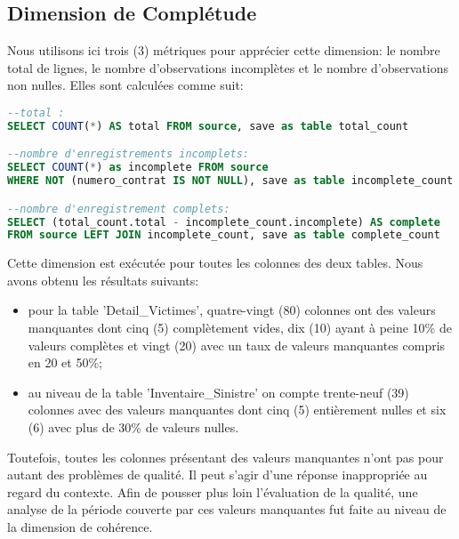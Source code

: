 \subsection{Dimension de Compl\'etude} 
Nous utilisons ici trois (3) m\'etriques pour appr\'ecier cette dimension: le nombre total de lignes, le nombre d'observations incompl\`etes et le nombre d'observations non nulles. Elles sont calcul\'ees comme suit: 
\begin{lstlisting}[language=SQL,caption={R\`egles de la Dimension Compl\'etude},captionpos=b ,showspaces=false,basicstyle=\scriptsize,numbers=none,commentstyle=\color{gray},backgroundcolor=\color{background}]
--total : 
SELECT COUNT(*) AS total FROM source, save as table total_count

--nombre d'enregistrements incomplets: 
SELECT COUNT(*) as incomplete FROM source 
WHERE NOT (numero_contrat IS NOT NULL), save as table incomplete_count

--nombre d'enregistrement complets: 
SELECT (total_count.total - incomplete_count.incomplete) AS complete 
FROM source LEFT JOIN incomplete_count, save as table complete_count
\end{lstlisting}
Cette dimension est ex\'ecut\'ee pour toutes les colonnes des deux tables. Nous avons obtenu les r\'esultats suivants:  
\begin{itemize}[parsep=0cm,itemsep=0cm]
\item pour la table 'Detail\_Victimes', quatre-vingt (80) colonnes ont des valeurs manquantes dont cinq (5) compl\`etement vides, dix (10) ayant \`a peine 10\% de valeurs compl\`etes et vingt (20) avec un taux de valeurs manquantes compris en 20 et 50\%;
\item au niveau de la table 'Inventaire\_Sinistre' on compte trente-neuf (39) colonnes avec des valeurs manquantes dont cinq (5) enti\`erement nulles et six (6) avec plus de 30\% de valeurs nulles.
\end{itemize}
Toutefois, toutes les colonnes pr\'esentant des valeurs manquantes n'ont pas pour autant des probl\`emes de qualit\'e. Il peut s'agir d'une r\'eponse inappropri\'ee au regard du contexte. Afin de pousser plus loin l'\'evaluation de la qualit\'e, une analyse de la p\'eriode couverte par ces valeurs manquantes fut faite au niveau de la dimension de coh\'erence.

